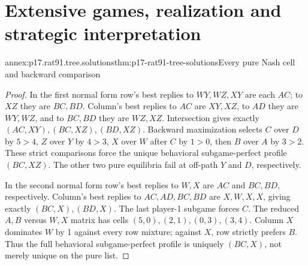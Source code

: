 \section{Extensive games, realization and strategic interpretation}
\label{annex:p17-rationality-9-1}

\begin{annexitem}{annex:p17.rat91.tree.solutions}{thm:p17-rat91-tree-solutions}{Every pure Nash cell and backward comparison}
\begin{proof}
In the first normal form row's best replies to \(WY,WZ,XY\)
are each \(AC\); to \(XZ\) they are \(BC,BD\).
Column's best replies to \(AC\) are \(XY,XZ\), to
\(AD\) they are \(WY,WZ\), and to \(BC,BD\) they
are \(WZ,XZ\). Intersection gives exactly
\((AC,XY),(BC,XZ),(BD,XZ)\).
Backward maximization selects \(C\) over \(D\) by \(5>4\),
\(Z\) over \(Y\) by \(4>3\), \(X\) over \(W\)
after \(C\) by \(1>0\), then \(B\) over \(A\)
by \(3>2\). These strict comparisons force the unique
behavioral subgame-perfect profile \((BC,XZ)\).
The other two pure equilibria fail at off-path \(Y\)
and \(D\), respectively.

In the second normal form row's best replies to \(W,X\)
are \(AC\) and \(BC,BD\), respectively. Column's
best replies to \(AC,AD,BC,BD\) are \(X,W,X,X\),
giving exactly \((BC,X),(BD,X)\). The last player-1
subgame forces \(C\). The reduced \(A,B\) versus
\(W,X\) matrix has cells \((5,0),(2,1),(0,3),(3,4)\).
Column \(X\) dominates \(W\) by 1 against every row
mixture; against \(X\), row strictly prefers \(B\).
Thus the full behavioral subgame-perfect profile is uniquely
\((BC,X)\), not merely unique on the pure list.
\end{proof}
\end{annexitem}

